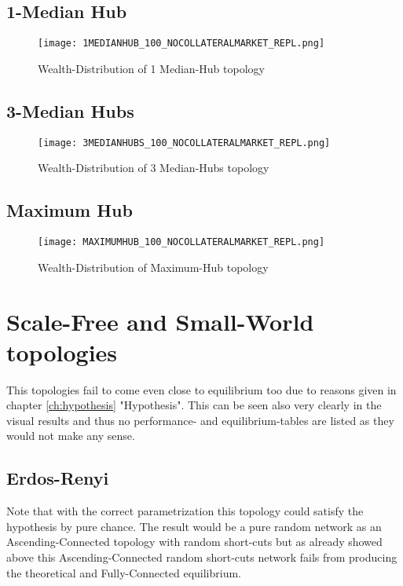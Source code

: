 \documentclass[Bachelorarbeit.tex]{subfiles}
\begin{document}
\subsection{1-Median Hub}
\begin{figure}[H]
	\centering
  \texttt{[image: 1MEDIANHUB\_100\_NOCOLLATERALMARKET\_REPL.png]}
	\caption{Wealth-Distribution of 1 Median-Hub topology}
	\label{fig:wealth_1MEDIANHUB_100_NOCOLLATERALMARKET_REPL}
\end{figure}

\subsection{3-Median Hubs}
\begin{figure}[H]
	\centering
  \texttt{[image: 3MEDIANHUBS\_100\_NOCOLLATERALMARKET\_REPL.png]}
	\caption{Wealth-Distribution of 3 Median-Hubs topology}
	\label{fig:wealth_3MEDIANHUBS_100_NOCOLLATERALMARKET_REPL}
\end{figure}

\subsection{Maximum Hub}
\begin{figure}[H]
	\centering
  \texttt{[image: MAXIMUMHUB\_100\_NOCOLLATERALMARKET\_REPL.png]}
	\caption{Wealth-Distribution of Maximum-Hub topology}
	\label{fig:wealth_MAXIMUMHUB_100_NOCOLLATERALMARKET_REPL}
\end{figure}

\section{Scale-Free and Small-World topologies}
This topologies fail to come even close to equilibrium too due to reasons given in chapter \ref{ch:hypothesis} "Hypothesis". This can be seen also very clearly in the visual results and thus no performance- and equilibrium-tables are listed as they would not make any sense.

\subsection{Erdos-Renyi}
Note that with the correct parametrization this topology could satisfy the hypothesis by pure chance. The result would be a pure random network as an Ascending-Connected topology with random short-cuts but as already showed above this Ascending-Connected random short-cuts network fails from producing the theoretical and Fully-Connected equilibrium.
\end{document}
